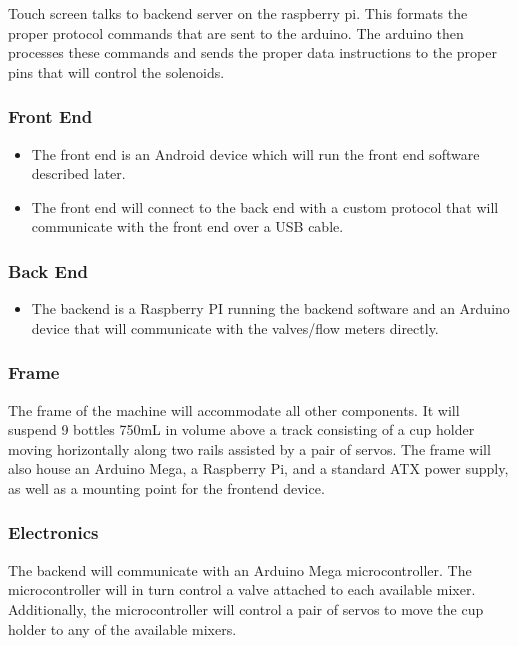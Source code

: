 {    Touch screen talks to backend server on the raspberry pi. This formats the 
    proper protocol commands that are sent to the arduino. The arduino then 
    processes these commands and sends the proper data instructions to the 
    proper pins that will control the solenoids.

    \subsubsection{Front End}
        \begin{itemize}
            \item The front end is an Android device which will run the front 
            end software described later.
            \item The front end will connect to the back end with a custom 
            protocol that will communicate with the front end over a USB cable.
        \end{itemize}

    \subsubsection{Back End}
        \begin{itemize}
            \item The backend is a Raspberry PI running the backend software 
            and an Arduino device that will communicate with the valves/flow
            meters directly.
        \end{itemize}


    
    \subsubsection{Frame}

	    The frame of the machine will accommodate all other components.  It 
        will suspend 9 bottles 750mL in volume above a track consisting of a 
        cup holder moving horizontally along two rails assisted by a pair of 
        servos.  The frame will also house an Arduino Mega, a Raspberry Pi, 
        and a standard ATX power supply, as well as a mounting point for the 
        frontend device.

    \subsubsection{Electronics}

        The backend will communicate with an Arduino Mega microcontroller.  
        The microcontroller will in turn control a valve attached to each 
        available mixer.  Additionally, the microcontroller will control a 
        pair of servos to move the cup holder to any of the available mixers.

}
